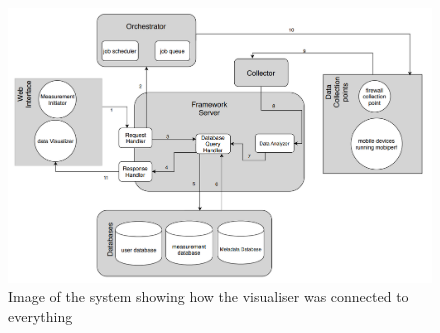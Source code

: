 \begin{figure}
	\centering
	\includegraphics[width=0.7\linewidth]{images/system}
	\caption{Image of the system showing how the visualiser was connected to everything}
	\label{fig:system}
\end{figure}